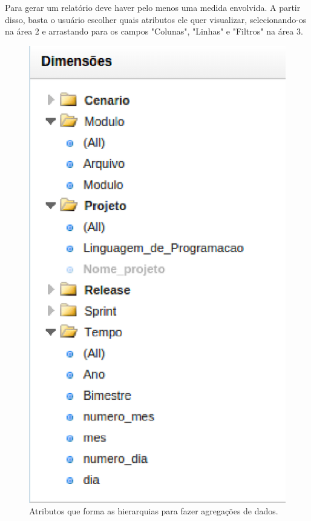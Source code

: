Para gerar um relatório deve haver pelo menos uma medida envolvida. A partir disso, basta o usuário escolher quais atributos ele quer visualizar, selecionando-os na área 2 e arrastando para os campos "Colunas", "Linhas" e "Filtros" na área 3.



\begin{figure}[H]
	\centering
	\includegraphics[scale=0.6]{figuras/dw-hierarquias}
	\caption{Atributos que forma as hierarquias para fazer agregações de dados.}
	\label{dw-hierarquias}
\end{figure}

